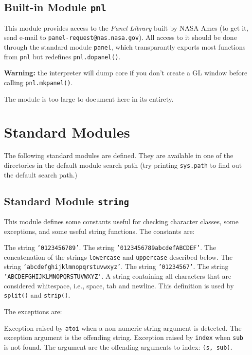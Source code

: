 \subsection{Built-in Module {\tt pnl}}

This module provides access to the
{\em Panel Library}
built by NASA Ames (to get it, send e-mail to
{\tt panel-request@nas.nasa.gov}).
All access to it should be done through the standard module
{\tt panel},
which transparantly exports most functions from
{\tt pnl}
but redefines
{\tt pnl.dopanel()}.

{\bf Warning:}
the {\Python} interpreter will dump core if you don't create a GL window
before calling
{\tt pnl.mkpanel()}.

The module is too large to document here in its entirety.

\section{Standard Modules}

The following standard modules are defined.
They are available in one of the directories in the default module
search path (try printing
{\tt sys.path}
to find out the default search path.)

\subsection{Standard Module {\tt string}}

This module defines some constants useful for checking character
classes, some exceptions, and some useful string functions.
The constants are:
\begin{description}
The string
{\tt '0123456789'}.
The string
{\tt '0123456789abcdefABCDEF'}.
The concatenation of the strings
{\tt lowercase}
and
{\tt uppercase}
described below.
The string
{\tt 'abcdefghijklmnopqrstuvwxyz'}.
The string
{\tt '01234567'}.
The string
{\tt 'ABCDEFGHIJKLMNOPQRSTUVWXYZ'}.
A string containing all characters that are considered whitespace,
i.e.,
space, tab and newline.
This definition is used by
{\tt split()}
and
{\tt strip()}.
\end{description}

The exceptions are:
\begin{description}
Exception raised by
{\tt atoi}
when a non-numeric string argument is detected.
The exception argument is the offending string.
Exception raised by
{\tt index}
when
{\tt sub}
is not found.
The argument are the offending arguments to index: {\tt (s, sub)}.
\end{description}

